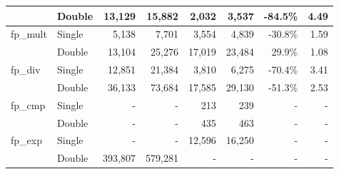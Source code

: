 \begin{table}
\begin{tabular}{l|l||rr||rr||rr}
                            & Double                                          & 13,129                      & 15,882                           & 2,032                       & 3,537                            & -84.5\%                 & 4.49                    \\ \hline
\multirow{2}{*}{fp\_mult}   & Single                                          & 5,138                       & 7,701                            & 3,554                       & 4,839                            & -30.8\%                 & 1.59                    \\
                            & Double                                          & 13,104                      & 25,276                           & 17,019                      & 23,484                           & 29.9\%                  & 1.08                    \\ \hline \hline
\multirow{2}{*}{fp\_div}    & Single                                          & 12,851                      & 21,384                           & 3,810                       & 6,275                            & -70.4\%                 & 3.41                    \\
                            & Double                                          & 36,133                      & 73,684                           & 17,585                      & 29,130                           & -51.3\%                 & 2.53                    \\ \hline \hline
\multirow{2}{*}{fp\_cmp}    & Single                                          & -                           & -                                & 213                         & 239                              & -                       & -                       \\
                            & Double                                          & -                           & -                                & 435                         & 463                              & -                       & -                       \\ \hline \hline
\multirow{2}{*}{fp\_exp}    & Single                                          & -                           & -                                & 12,596                      & 16,250                           & -                       & -                       \\
                            & Double                                          & 393,807                     & 579,281                          & -                           & -                                & -                       & -                       \\ \hline \hline

\end{tabular}
\end{table}
